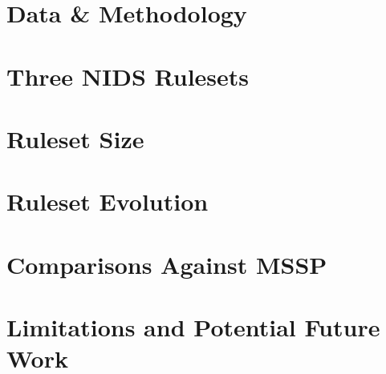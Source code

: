 \section{Data & Methodology}
\section{Three NIDS Rulesets}
\section{Ruleset Size}
\section{Ruleset Evolution}
\section{Comparisons Against MSSP}
\section{Limitations and Potential Future Work}